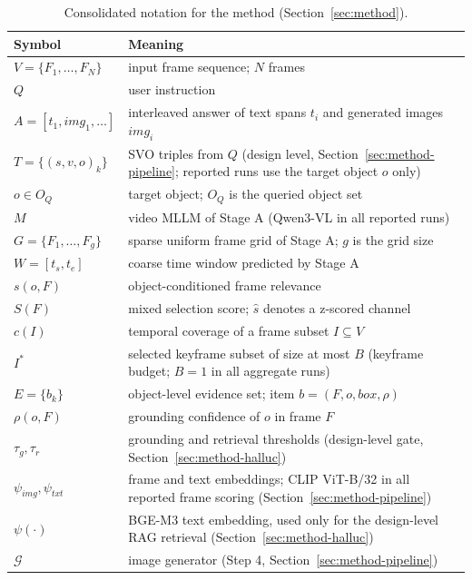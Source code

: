 \documentclass[10pt]{article}
\begin{document}
\begin{table}[htbp]
\centering
\begin{tabular}{@{}lp{8.6cm}@{}}
\toprule
Symbol & Meaning \\
\midrule
$V = \{F_1,\ldots,F_N\}$ & input frame sequence; $N$ frames \\
$Q$ & user instruction \\
$A = [t_1, img_1, \ldots]$ & interleaved answer of text spans $t_i$ and generated images $img_i$ \\
$T = \{(s,v,o)_k\}$ & SVO triples from $Q$ (design level, Section~\ref{sec:method-pipeline}; reported runs use the target object $o$ only) \\
$o \in O_Q$ & target object; $O_Q$ is the queried object set \\
$M$ & video MLLM of Stage A (Qwen3-VL in all reported runs) \\
$G = \{F_1,\ldots,F_g\}$ & sparse uniform frame grid of Stage A; $g$ is the grid size \\
$W = [t_s, t_e]$ & coarse time window predicted by Stage A \\
$s(o,F)$ & object-conditioned frame relevance \\
$S(F)$ & mixed selection score; $\hat{s}$ denotes a z-scored channel \\
$c(I)$ & temporal coverage of a frame subset $I \subseteq V$ \\
$I^*$ & selected keyframe subset of size at most $B$ (keyframe budget; $B=1$ in all aggregate runs) \\
$E = \{b_k\}$ & object-level evidence set; item $b = (F,o,box,\rho)$ \\
$\rho(o,F)$ & grounding confidence of $o$ in frame $F$ \\
$\tau_g, \tau_r$ & grounding and retrieval thresholds (design-level gate, Section~\ref{sec:method-halluc}) \\
$\psi_{img}, \psi_{txt}$ & frame and text embeddings; CLIP ViT-B/32 in all reported frame scoring (Section~\ref{sec:method-pipeline}) \\
$\psi(\cdot)$ & BGE-M3 text embedding, used only for the design-level RAG retrieval (Section~\ref{sec:method-halluc}) \\
$\mathcal{G}$ & image generator (Step 4, Section~\ref{sec:method-pipeline}) \\
\bottomrule
\end{tabular}
\caption{Consolidated notation for the method (Section~\ref{sec:method}).}
\label{tab:notation}
\end{table}
\end{document}
